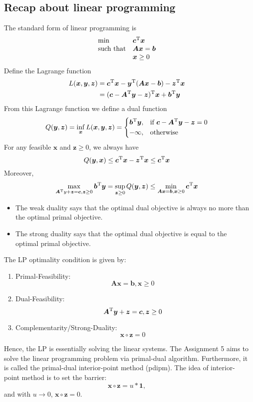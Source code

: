 \subsection{Recap about linear programming}
The standard form of linear programming is
\[
\begin{array}{ll}
\min&\bm c^{\mathrm T}\bm x\\
\mbox{such that}&\bm{Ax}=\bm b\\
&\bm x\ge0
\end{array}
\]
Define the Lagrange function
\[
\begin{aligned}
L(\bm x,\bm y,\bm z)&=\bm c^{\mathrm T}\bm x - \bm y^{\mathrm T}(\bm{Ax}-\bm b) - \bm z^{\mathrm T}\bm x\\
&=(\bm c-\bm A^{\mathrm T}\bm y-\bm z)^{\mathrm T}\bm x+\bm b^{\mathrm T}\bm y
\end{aligned}
\]
From this Lagrange function we define a dual function
\[
Q(\bm y,\bm z)=\inf_{\bm x}L(\bm x,\bm y,\bm z)=\left\{
\begin{aligned}
\bm b^{\mathrm T}\bm y,&\quad\mbox{if }\bm c-\bm A^{\mathrm T}\bm y-\bm z=0\\
-\infty,&\quad\mbox{otherwise}
\end{aligned}
\right.
\]
For any feasible $\bm x$ and $\bm z\ge0$, we always have
\[
Q(\bm y,\bm x)\le\bm c^{\mathrm T}\bm x-\bm z^{\mathrm T}\bm x\le\bm c^{\mathrm T}\bm x
\]
Moreover, 
\[
\max_{\bm A^{\mathrm T} y+\bm z=\bm c,\bm z\ge0}\bm b^{\mathrm T}\bm y=
\sup_{\bm z\ge0}Q(\bm y,\bm z)\le\min_{\bm{Ax}=\bm b,\bm x\ge0}\bm c^{\mathrm T}\bm x
\]
\begin{itemize}
\item
The weak duality says that the optimal dual objective is always no more than the optimal primal objective.
\item
The strong duality says that the optimal dual objective is equal to the optimal primal objective.
\end{itemize}
\begin{theorem}
The LP optimality condition is given by:
\begin{enumerate}
\item
Primal-Feasibility:
\[
\bm{Ax}=\bm b,\bm x\ge0
\]
\item
Dual-Feasibility:
\[
\bm A^{\mathrm T}\bm y+\bm z=\bm c,\bm z\ge0
\]
\item
Complementarity/Strong-Duality:
\[
\bm x\circ \bm z=0
\]
\end{enumerate}
\end{theorem}
\begin{remark}
Hence, the LP is essentially solving the linear systems. The Assignment 5 aims to solve the linear programming problem via primal-dual algorithm. Furthermore, it is called the primal-dual interior-point method (pdipm). The idea of interior-point method is to set the barrier:
\[
\bm x\circ\bm  z=u*\bm 1,
\]
and with $u\to0$, $\bm x\circ \bm z=0$.
\end{remark}
